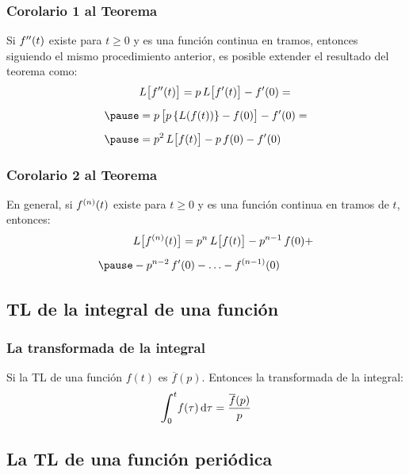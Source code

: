\begin{frame}
\frametitle{Corolario 1 al Teorema}
Si ${f}^{\prime \prime} (t)$ existe para $t \geq 0$ y es una función continua en tramos, \pause entonces siguiendo el mismo procedimiento anterior, es posible extender el resultado del teorema como:
\pause
\begin{eqnarray}
\begin{aligned}[b]
&L \big[  \sderivada{f} (t)  \big] = p \, L \big[  \pderivada{f} (t)  \big] - \pderivada{f} (0) = \\[0.5em] \pause
&= p \, \big[  p \left\{ L (f (t)) \right\} - f (0)  \big] - \pderivada{f} (0) = \\[0.5em] \pause
&= p^{2} \, L \big[  f (t)  \big] - p \, f (0) - \pderivada{f} (0)
\end{aligned}
\label{eq:ecuacion_03_12}
\end{eqnarray}
\end{frame}
\begin{frame}
\frametitle{Corolario 2 al Teorema}
En general, si ${f}^{(n)} (t)$ existe para $t \geq 0$ y es una función continua en tramos de $t$, entonces:
\pause
\begin{eqnarray}
\begin{aligned}[b]
&L \big[  \nderivada{f}{n} (t)  \big] = p^{n} \, L \big[  f (t)  \big] - p^{n-1} \, f (0) + \\[0.5em] \pause
&- p^{n-2} \, \pderivada{f}(0) - \ldots - \ntilde{f}{n-1} (0)
\end{aligned}
\label{eq:ecuacion_03_13}
\end{eqnarray}
\end{frame}

\subsection{TL de la integral de una función}

\begin{frame}
\frametitle{La transformada de la integral}
Si la TL de una función $f (t)$ es $\overline{f} (p)$. Entonces la transformada de la integral:
\pause
\begin{align}
\scaleint{6ex}_{\bs 0}^{t} f (\tau) \dd{\tau} = \dfrac{\overline{f} (p)}{p}
\label{eq:ecuacion_03_16}
\end{align}
\end{frame}

\subsection{La TL de una función periódica}


